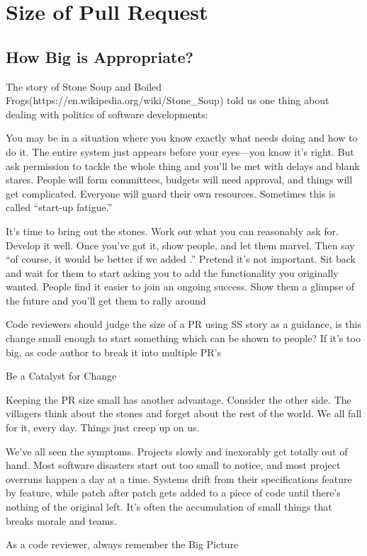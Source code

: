 
\chapter{Size of Pull Request}

\section{How Big is Appropriate?}

The story of Stone Soup and Boiled Frogs(https://en.wikipedia.org/wiki/Stone\_Soup) told us one thing about dealing with politics of software developments:

You may be in a situation where you know exactly what needs doing and how to do it. The entire system just appears before your eyes—you know it's right. But ask permission to tackle the whole thing and you'll be met with delays and blank stares. People will form committees, budgets will need approval, and things will get complicated. Everyone will guard their own resources. Sometimes this is called “start-up fatigue.”

It's time to bring out the stones. Work out what you can reasonably ask for. Develop it well. Once you've got it, show people, and let them marvel. Then say “of course, it would be better if we added .” Pretend it's not important. Sit back and wait for them to start asking you to add the functionality you originally wanted. People find it easier to join an ongoing success. Show them a glimpse of the future and you'll get them to rally around

Code reviewers should judge the size of a PR using SS story as a guidance, is this change small enough to start something which can be shown to people? If it's too big, as code author to break it into multiple PR's

\begin{marker}
Be a Catalyst for Change
\end{marker}

Keeping the PR size small has another advantage. Consider the other side. The villagers think about the stones and forget about the rest of the world. We all fall for it, every day. Things just creep up on us.

We've all seen the symptoms. Projects slowly and inexorably get totally out of hand. Most software disasters start out too small to notice, and most project overruns happen a day at a time. Systems drift from their specifications feature by feature, while patch after patch gets added to a piece of code until there's nothing of the original left. It's often the accumulation of small things that breaks morale and teams.

\begin{marker}
As a code reviewer, always remember the Big Picture
\end{marker}
